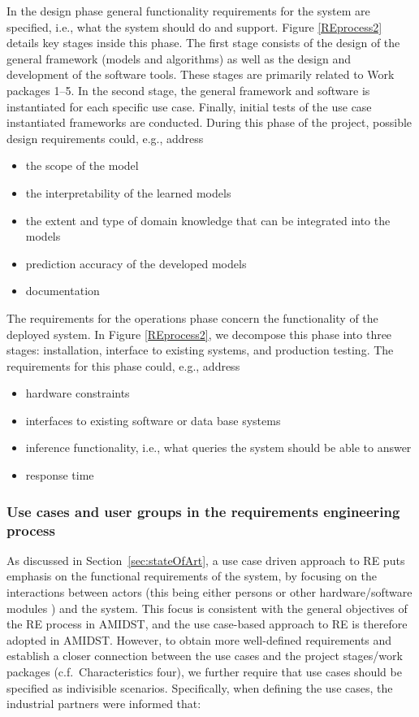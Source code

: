 In the design phase  general functionality requirements for the system are specified, i.e., what the system should do and 
support.
Figure \ref{REprocess2} details key stages inside this phase. The first stage consists of the design of the general
framework (models and algorithms) as well as the design and development of the software tools. These stages are 
primarily
related to Work packages 1--5. In the second stage, the general framework and software is instantiated for each specific
use case. Finally, initial tests of the use case instantiated frameworks are conducted.  During this phase of the project, 
possible design requirements could, e.g., address
\begin{itemize}[itemsep=2pt,parsep=2pt,topsep=4pt, partopsep=4pt]
 \item the scope of the model
 \item the interpretability of the learned models
 \item the extent and type of domain knowledge that can be integrated into the models
 \item prediction accuracy of the developed models
 \item documentation
\end{itemize}

The requirements for the operations phase concern the functionality of the deployed system. In Figure \ref{REprocess2}, 
we decompose this phase into three stages: installation, interface to existing systems, and production testing. The 
requirements for this phase could, e.g., address
\begin{itemize}[itemsep=2pt,parsep=2pt,topsep=4pt, partopsep=4pt]
 \item hardware constraints
 \item interfaces to existing software or data base systems
 \item inference functionality, i.e., what queries the system should be able to answer
 \item response time
\end{itemize}


\subsubsection{Use cases and user groups in the requirements engineering process}
As discussed in Section~\ref{sec:stateOfArt}, a use case driven approach to RE puts emphasis on
the functional requirements of the system, by focusing on the
interactions between actors (this being either persons or other hardware/software modules ) and the system. This focus
is consistent with the general objectives of the RE process in AMIDST, and the use case-based
approach to RE is therefore adopted in AMIDST. However, to obtain more well-defined
requirements and establish a closer connection
between the use cases and the project stages/work packages (c.f.\ Characteristics four), we further require that use
cases should be specified as indivisible scenarios. Specifically, when defining the use cases, 
the industrial partners were informed that:

